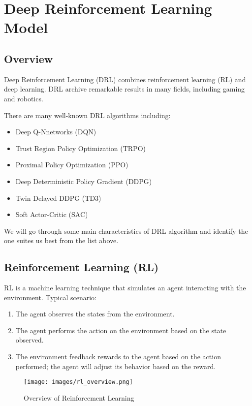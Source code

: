 \chapter{Deep Reinforcement Learning Model}
\label{c:drl}
\section{Overview}
Deep Reinforcement Learning (DRL) combines reinforcement learning (RL) and deep learning. DRL archive remarkable results in many fields, including gaming\cite{mnih2013playing} and robotics\cite{levine2016end}. 
\par 
There are many well-known DRL algorithms including: 
\begin{itemize}
    \item Deep Q-Nnetworks (DQN) \cite{mnih2013playing}
    \item Trust Region Policy Optimization (TRPO) \cite{schulman2015trust}
    \item Proximal Policy Optimization (PPO) \cite{schulman2017proximal}
    \item Deep Deterministic Policy Gradient (DDPG) \cite{silver2014deterministic}
    \item Twin Delayed DDPG (TD3) \cite{fujimoto2018addressing}
    \item Soft Actor-Critic (SAC) \cite{haarnoja2018soft} 
\end{itemize}

We will go through some main characteristics of DRL algorithm and identify the one suites us best from the list above.

\section{Reinforcement Learning (RL)}
RL is a machine learning technique that simulates an agent interacting with the environment. Typical scenario:
    \begin{enumerate}
        \item The agent observes the states from the environment.
        \item The agent performs the action on the environment based on the state observed.
        \item The environment feedback rewards to the agent based on the action performed; the agent will adjust its behavior based on the reward. 
    \end{enumerate}
\begin{figure}[ht]
  \centering\texttt{[image: images/rl\_overview.png]}
  \caption [Overview of Reinforcement Learning]
  {Overview of Reinforcement Learning
  }
  \label{fig:rl_overview_diagram}
\end{figure}

